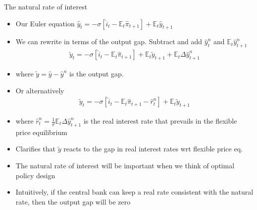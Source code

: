 \documentclass[11pt,aspectratio=169,xcolor={dvipsnames},hyperref={pdftex,pdfpagemode=UseNone,hidelinks,pdfdisplaydoctitle=true},usepdftitle=false]{beamer}
\begin{document}
\begin{frame}{The natural rate of interest}
\begin{itemize}
\item Our Euler equation	$\hat{y}_t =-\sigma[\hat{i}_t-\mathbb{E}_t \hat{\pi}_{t+1} ]+\mathbb{E}_t \hat{y}_{t+1} $
\item We can rewrite in terms of the output gap. Subtract and add $\hat{y}^n_t$ and $\mathbb{E}_t \hat{y}^n_{t+1}$
\begin{align}
\tilde{y}_t =-\sigma[\hat{i}_t-\mathbb{E}_t \hat{\pi}_{t+1} ]+\mathbb{E}_t \tilde{y}_{t+1}  + \mathbb{E}_t \Delta \hat{y}^n_{t+1}
\end{align}
\item where $\tilde{y} = \hat{y} - \hat{y}^n$ is the output gap.
\item Or alternatively
\begin{align}
\tilde{y}_t =-\sigma[\hat{i}_t-\mathbb{E}_t \hat{\pi}_{t+1} - \hat{r}^n_t ]+\mathbb{E}_t \tilde{y}_{t+1} 
\end{align}
\item where $\hat{r}^n_t = \frac{1}{\sigma}  \mathbb{E}_t \Delta \hat{y}^n_{t+1}$ is the real interest rate that prevails in the flexible price equilibrium
\item Clarifies that $\tilde{y}$ reacts to the gap in real interest rates wrt flexible price eq.\item The natural rate of interest will be important when we think of optimal policy design
\item Intuitively, if the central bank can keep a real rate consistent with the natural rate, then the output gap will be zero
\end{itemize}
\end{frame}
\end{document}
